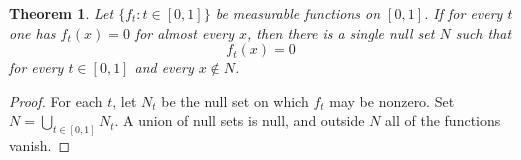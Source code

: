 \documentclass{article}
\newtheorem{theorem}{Theorem}
\begin{document}
\begin{theorem}\label{thm:uniform-null-set}
Let $\{f_t:t\in[0,1]\}$ be measurable functions on $[0,1]$. If for every
$t$ one has $f_t(x)=0$ for almost every $x$, then there is a single null
set $N$ such that
\[
  f_t(x)=0
\]
for every $t\in[0,1]$ and every $x\notin N$.
\end{theorem}
\begin{proof}
For each $t$, let $N_t$ be the null set on which $f_t$ may be nonzero.
Set $N=\bigcup_{t\in[0,1]}N_t$. A union of null sets is null, and outside
$N$ all of the functions vanish.
\end{proof}
\end{document}
